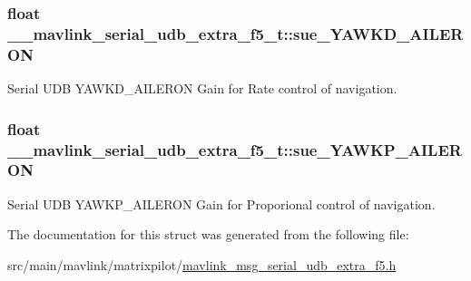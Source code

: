 \hypertarget{struct____mavlink__serial__udb__extra__f5__t_a1b4a059a78e93cf2b01f14e5ee1dacba}{
\subsubsection[{sue\+\_\+\+Y\+A\+W\+K\+D\+\_\+\+A\+I\+L\+E\+R\+O\+N}]{\setlength{\rightskip}{0pt plus 5cm}float \+\_\+\+\_\+mavlink\+\_\+serial\+\_\+udb\+\_\+extra\+\_\+f5\+\_\+t\+::sue\+\_\+\+Y\+A\+W\+K\+D\+\_\+\+A\+I\+L\+E\+R\+O\+N}}\label{struct____mavlink__serial__udb__extra__f5__t_a1b4a059a78e93cf2b01f14e5ee1dacba}


Serial U\+D\+B Y\+A\+W\+K\+D\+\_\+\+A\+I\+L\+E\+R\+O\+N Gain for Rate control of navigation. 

\hypertarget{struct____mavlink__serial__udb__extra__f5__t_a1f7b869f56f204b1ad40fad73c51de84}{
\subsubsection[{sue\+\_\+\+Y\+A\+W\+K\+P\+\_\+\+A\+I\+L\+E\+R\+O\+N}]{\setlength{\rightskip}{0pt plus 5cm}float \+\_\+\+\_\+mavlink\+\_\+serial\+\_\+udb\+\_\+extra\+\_\+f5\+\_\+t\+::sue\+\_\+\+Y\+A\+W\+K\+P\+\_\+\+A\+I\+L\+E\+R\+O\+N}}\label{struct____mavlink__serial__udb__extra__f5__t_a1f7b869f56f204b1ad40fad73c51de84}


Serial U\+D\+B Y\+A\+W\+K\+P\+\_\+\+A\+I\+L\+E\+R\+O\+N Gain for Proporional control of navigation. 



The documentation for this struct was generated from the following file\+:\begin{DoxyCompactItemize}
\item 
src/main/mavlink/matrixpilot/\hyperlink{mavlink__msg__serial__udb__extra__f5_8h}{mavlink\+\_\+msg\+\_\+serial\+\_\+udb\+\_\+extra\+\_\+f5.\+h}\end{DoxyCompactItemize}
